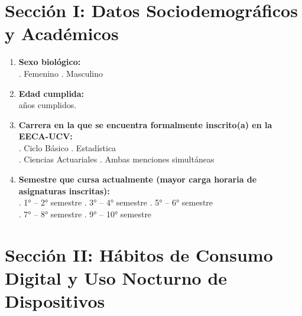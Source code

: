 \documentclass[12pt, letterpaper]{article}
\begin{document}
\vspace{0.4cm}

\section*{Sección I: Datos Sociodemográficos y Académicos}

\begin{enumerate}[leftmargin=*]
    \item \textbf{Sexo biológico:} \\
    . Femenino . Masculino

    \item \textbf{Edad cumplida:} \\
    \quad [\hspace{1.5cm}] años cumplidos.

    \item \textbf{Carrera en la que se encuentra formalmente inscrito(a) en la EECA-UCV:} \\
    . Ciclo Básico . Estadística \\
    . Ciencias Actuariales . Ambas menciones simultáneas

    \item \textbf{Semestre que cursa actualmente (mayor carga horaria de asignaturas inscritas):} \\
    . 1° -- 2° semestre . 3° -- 4° semestre . 5° -- 6° semestre \\
    . 7° -- 8° semestre . 9° -- 10° semestre
\end{enumerate}

\section*{Sección II: Hábitos de Consumo Digital y Uso Nocturno de Dispositivos}
\end{document}
